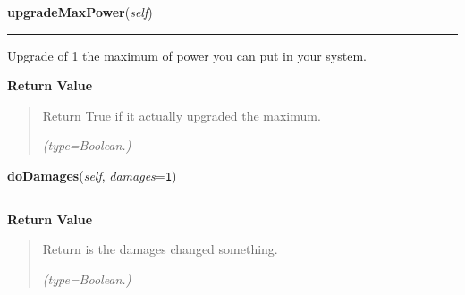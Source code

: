     \vspace{0.5ex}

\hspace{.8\funcindent}\begin{boxedminipage}{\funcwidth}

    \raggedright \textbf{upgradeMaxPower}(\textit{self})

    \vspace{-1.5ex}

    \rule{\textwidth}{0.5\fboxrule}
\setlength{\parskip}{2ex}
    Upgrade of 1 the maximum of power you can put in your system.

\setlength{\parskip}{1ex}
      \textbf{Return Value}
    \vspace{-1ex}

      \begin{quote}
      Return True if it actually upgraded the maximum.

      {\it (type=Boolean.)}

      \end{quote}

    \end{boxedminipage}

    \label{systems:System:doDamages}

    \vspace{0.5ex}

\hspace{.8\funcindent}\begin{boxedminipage}{\funcwidth}

    \raggedright \textbf{doDamages}(\textit{self}, \textit{damages}={\tt 1})

    \vspace{-1.5ex}

    \rule{\textwidth}{0.5\fboxrule}
\setlength{\parskip}{2ex}
\setlength{\parskip}{1ex}
      \textbf{Return Value}
    \vspace{-1ex}

      \begin{quote}
      Return is the damages changed something.

      {\it (type=Boolean.)}

      \end{quote}

    \end{boxedminipage}

    \label{systems:System:ionise}

